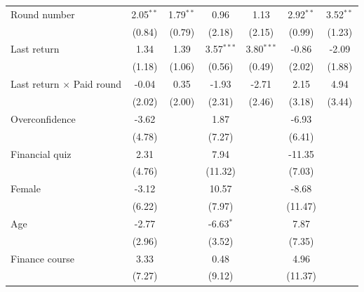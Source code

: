 \begin{tabular}{lcccccc}
   Round number                         & 2.05$^{**}$  & 1.79$^{**}$   & 0.96         & 1.13         & 2.92$^{**}$ & 3.52$^{**}$\\   
                                        & (0.84)       & (0.79)        & (2.18)       & (2.15)       & (0.99)      & (1.23)\\   
   Last return                          & 1.34         & 1.39          & 3.57$^{***}$ & 3.80$^{***}$ & -0.86       & -2.09\\   
                                        & (1.18)       & (1.06)        & (0.56)       & (0.49)       & (2.02)      & (1.88)\\   
   Last return $\times$ Paid round      & -0.04        & 0.35          & -1.93        & -2.71        & 2.15        & 4.94\\   
                                        & (2.02)       & (2.00)        & (2.31)       & (2.46)       & (3.18)      & (3.44)\\   
   Overconfidence                       & -3.62        &               & 1.87         &              & -6.93       &   \\   
                                        & (4.78)       &               & (7.27)       &              & (6.41)      &   \\   
   Financial quiz                       & 2.31         &               & 7.94         &              & -11.35      &   \\   
                                        & (4.76)       &               & (11.32)      &              & (7.03)      &   \\   
   Female                               & -3.12        &               & 10.57        &              & -8.68       &   \\   
                                        & (6.22)       &               & (7.97)       &              & (11.47)     &   \\   
   Age                                  & -2.77        &               & -6.63$^{*}$  &              & 7.87        &   \\   
                                        & (2.96)       &               & (3.52)       &              & (7.35)      &   \\   
   Finance course                       & 3.33         &               & 0.48         &              & 4.96        &   \\   
                                        & (7.27)       &               & (9.12)       &              & (11.37)     &   \\   

\end{tabular}

